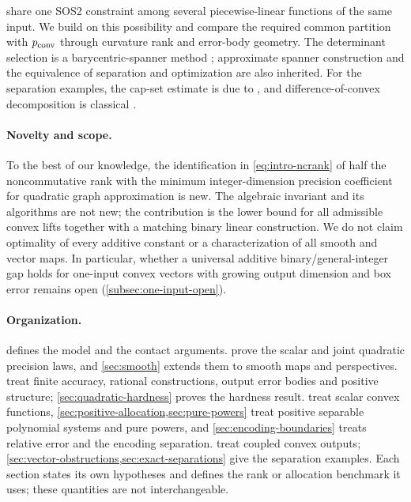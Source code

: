 \citet[Proposition 1]{lyu2026} share one SOS2 constraint among several
piecewise-linear functions of the same input. We build on this
possibility and compare the required common partition with $p_{\mathrm{conv}}$
through curvature rank and error-body geometry. The determinant
selection is a barycentric-spanner method \citep{awerbuch2004};
approximate spanner construction \citep{plevrakis2020} and the
equivalence of separation and optimization \citep{gls1981} are also
inherited. For the separation examples, the cap-set estimate is due to
\citet{ellenberg2017}, and difference-of-convex decomposition is
classical \citep{hartman1959}.

\paragraph{Novelty and scope.}
To the best of our knowledge, the identification in
\eqref{eq:intro-ncrank} of half the noncommutative rank with the minimum
integer-dimension precision coefficient for quadratic graph approximation
is new. The algebraic invariant and its algorithms are not new; the
contribution is the lower bound for all admissible convex lifts together
with a matching binary linear construction. We do not claim optimality of every additive constant or a
characterization of all smooth and vector maps. In particular, whether
a universal additive binary/general-integer gap holds for one-input
convex vectors with growing output dimension and box error remains open
(\cref{subsec:one-input-open}).

\paragraph{Organization.}
 defines the model and the contact arguments.
 prove the scalar and joint
quadratic precision laws, and \cref{sec:smooth} extends them to smooth
maps and perspectives. 
treat finite accuracy, rational constructions, output error bodies and
positive structure; \cref{sec:quadratic-hardness} proves the hardness
result.  treat scalar
convex functions, \cref{sec:positive-allocation,sec:pure-powers} treat
positive separable polynomial systems and pure powers, and
\cref{sec:encoding-boundaries} treats relative error and the encoding
separation.
 treat coupled
convex outputs; \cref{sec:vector-obstructions,sec:exact-separations}
give the separation examples.
Each section states its own hypotheses and defines the rank or
allocation benchmark it uses; these quantities are not interchangeable.

